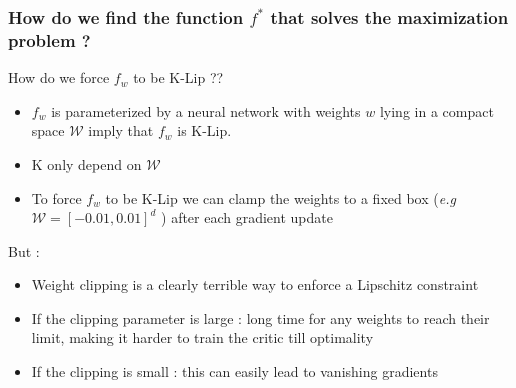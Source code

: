 \documentclass[french,9pt]{beamer}
\begin{document}
\begin{frame}
\frametitle{How do we find the function $f^{*}$ that solves the maximization problem ?}

How do we force $f_{w}$ to be K-Lip ??

\begin{itemize}
\item $f_{w}$ is parameterized by a neural network with weights $w$ lying in a compact space $\mathcal{W}$ imply that $f_{w}$ is K-Lip.
\item K only depend on $\mathcal{W}$
\item To force $f_{w}$ to be K-Lip we can clamp the weights to a fixed box (\textit{e.g} $\mathcal{W} = [-0.01,0.01]^{d}$ ) after each gradient update
\end{itemize}

\pause 

But :

\begin{itemize}
\item Weight clipping is a clearly terrible way to enforce a Lipschitz constraint
\item If the clipping parameter is large : long time for any weights to reach their limit, making it harder to train the critic till optimality
\item If the clipping is small : this can easily lead to vanishing gradients
\end{itemize}

\end{frame}


\end{document}
